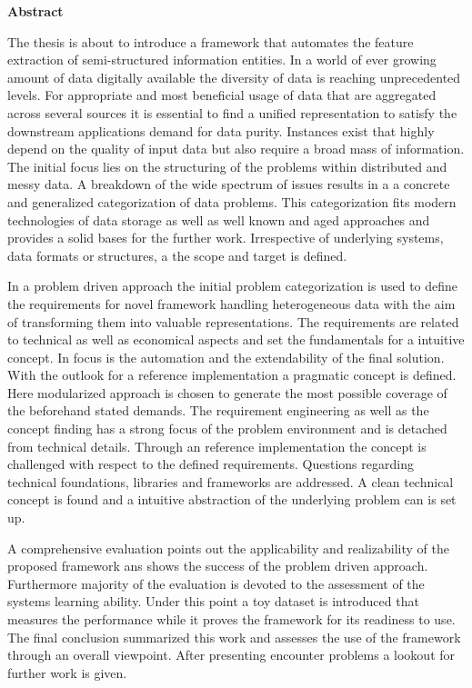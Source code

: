 \thispagestyle{empty}
\vspace*{1.0cm}

\begin{center}
    \textbf{Abstract}
\end{center}

\vspace*{0.5cm}

\noindent
The thesis is about to introduce a framework that automates the feature extraction of semi-structured information entities. In a world of ever growing amount of data digitally available the diversity of data is reaching unprecedented levels. For appropriate and most beneficial usage of data that are aggregated across several sources it is essential to find a unified representation to satisfy the downstream applications demand for data purity. Instances exist that highly depend on the quality of input data but also require a broad mass of information. The initial focus lies on the structuring of the problems within distributed and messy data. A breakdown of the wide spectrum of issues results in a a concrete and generalized categorization of data problems.  This categorization fits modern technologies of data storage as well as well known and aged approaches and provides a solid bases for the further work. Irrespective of underlying systems, data formats or structures, a the scope and target is defined. 

In a problem driven approach the initial problem categorization is used to define the requirements for novel framework handling heterogeneous data with the aim of transforming them into valuable representations. The requirements are related to technical as well as economical aspects and set the fundamentals for a intuitive concept. In focus is the automation and the extendability of the final solution. With the outlook for a reference implementation a pragmatic concept is defined. Here modularized approach is chosen to generate the most possible coverage of the beforehand stated demands. The requirement engineering as well as the concept finding has a strong focus of the problem environment and is detached from technical details. Through an reference implementation the concept is challenged with respect to the defined requirements. Questions regarding technical foundations, libraries and frameworks are addressed. A clean technical concept is found and a intuitive abstraction of the underlying problem can is set up. 

A comprehensive evaluation points out the applicability and realizability of the proposed framework ans shows the success of the problem driven approach. Furthermore majority of the evaluation is devoted to the assessment of the systems learning ability. Under this point a toy dataset is introduced that measures the performance while it proves the framework for its readiness to use. The final conclusion summarized this work and assesses the use of the framework through an overall viewpoint. After presenting encounter problems a lookout for further work is given.